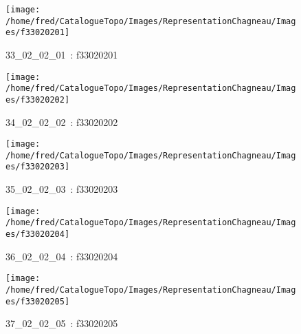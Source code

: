 \documentclass[12pt,titlepage]{book}
\begin{document}
\begin{figure}[h!]
  \hfill         %
  \begin{minipage}[t]{3cm}
    \begin{center}
      \texttt{[image: /home/fred/CatalogueTopo/Images/RepresentationChagneau/Images/f33020201]}
      \caption[~33\_02\_02\_01]{\small{33\_02\_02\_01~:} \tiny{f33020201}}\label{f33020201}
    \end{center}
  \end{minipage}
  \begin{minipage}[t]{3cm}
    \begin{center}
      \texttt{[image: /home/fred/CatalogueTopo/Images/RepresentationChagneau/Images/f33020202]}
      \caption[~34\_02\_02\_02]{\small{34\_02\_02\_02~:} \tiny{f33020202}}\label{f33020202}
    \end{center}
  \end{minipage}
  \begin{minipage}[t]{3cm}
    \begin{center}
      \texttt{[image: /home/fred/CatalogueTopo/Images/RepresentationChagneau/Images/f33020203]}
      \caption[~35\_02\_02\_03]{\small{35\_02\_02\_03~:} \tiny{f33020203}}\label{f33020203}
    \end{center}
  \end{minipage}
  \begin{minipage}[t]{3cm}
    \begin{center}
      \texttt{[image: /home/fred/CatalogueTopo/Images/RepresentationChagneau/Images/f33020204]}
      \caption[~36\_02\_02\_04]{\small{36\_02\_02\_04~:} \tiny{f33020204}}\label{f33020204}
    \end{center}
  \end{minipage}
  \begin{minipage}[t]{3cm}
    \begin{center}
      \texttt{[image: /home/fred/CatalogueTopo/Images/RepresentationChagneau/Images/f33020205]}
      \caption[~37\_02\_02\_05]{\small{37\_02\_02\_05~:} \tiny{f33020205}}\label{f33020205}
    \end{center}
  \end{minipage}
  \begin{minipage}[t]{3cm}

\end{minipage}
\end{figure}
\end{document}

